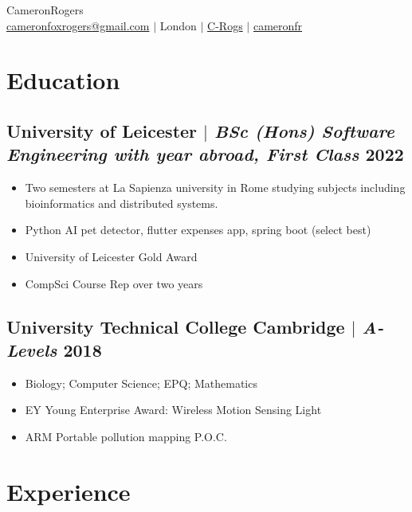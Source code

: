 \documentclass[10pt]{article}
\begin{document}
\begin{center}
    {\fontsize{32}{32}\selectfont\interthin Cameron\interheavy Rogers} \\ \bigskip
    {\color{icnclr}\faEnvelope[regular]} \href{mailto:hi@example.com}{cameronfoxrogers@gmail.com} $|$ 
    {\color{icnclr}} {London} $|$
    {\color{icnclr}} \href{https://github.com/C-Rogs}{C-Rogs} $|$
    {\color{icnclr}\faLinkedinIn} \href{https://www.linkedin.com/in/cameronfr}{cameronfr}
\end{center}

\section{Education}
\subsection{University of Leicester $|$ {\small\normalfont\textit{BSc (Hons) Software Engineering with year abroad, First Class}} \small\hfill 2022}
\begin{itemize}
    \item Two semesters at La Sapienza university in Rome studying subjects including bioinformatics and distributed systems.
    \item Python AI pet detector, flutter expenses app, spring boot (select best) 
    \item University of Leicester Gold Award 
    \item CompSci Course Rep over two years
\end{itemize}

\subsection{University Technical College Cambridge $|$ {\small\normalfont\textit{A-Levels}} \small\hfill 2018}
\begin{itemize}
    \item Biology; Computer Science; EPQ; Mathematics 
    \item EY Young Enterprise Award: Wireless Motion Sensing Light 
    \item ARM Portable pollution mapping P.O.C.
\end{itemize}

\section{Experience}
\end{document}
